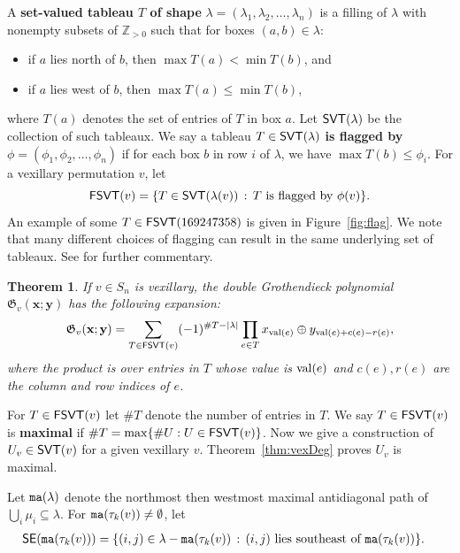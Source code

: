\documentclass[12pt]{amsart}
\newtheorem{theorem}{Theorem}[section]
\theoremstyle{definition}
\theoremstyle{remark}
\numberwithin{equation}{section}
\newcommand \maCR[1]{{\tt ma}(#1)}
\newcommand\mydef[1]{{\bf #1}}
\newcommand{\FSVT}{{\sf FSVT}}
\newcommand{\SVT}{{\sf SVT}}
\newcommand{\SE}{{\sf SE}}
\newcommand{\val}{{\rm val}}
\newcommand{\Sym}{S}
\begin{document}
A \mydef{set-valued tableau $T$ of shape} $\lambda=(\lambda_1,\lambda_2,\ldots,\lambda_n)$ is a filling 
of $\lambda$ with nonempty subsets of $\mathbb{Z}_{>0}$ such that for boxes $(a,b)\in\lambda$:
\begin{itemize}
    \item if $a$ lies north of $b$, then $\max T(a)<\min T(b)$, and
    \item if $a$ lies west of $b$, then $\max T(a)\leq\min T(b)$,
\end{itemize}
where $T(a)$  denotes the set of entries of $T$ in box $a$.
Let $\SVT(\lambda)$ be the collection of such tableaux. 
We say a tableau $T \in \SVT(\lambda)$ \mydef{is flagged by}
$\phi=(\phi_1,\phi_2,\ldots,\phi_n)$ if for each box $b$ in row $i$ of $\lambda$, we have $\max{T(b)}\leq \phi_i$. For a vexillary permutation $v$, let 
\[\FSVT(v)=\{T\in \SVT(\lambda(v)) \,:  \, T \text{ is flagged by } \phi(v)\}.\]
An example of some $T\in \FSVT(169247358)$ 
is given in Figure~\ref{fig:flag}.
We note that many different choices of flagging can result in the same underlying set of tableaux.  See \cite[Remark~3.10]{MPP} for further commentary.

\begin{theorem}\cite[Theorem 5.8]{KMY}
If $v\in \Sym_n$ is vexillary, the double Grothendieck polynomial $\mathfrak G_{v}(\mathbf x;\mathbf y)$ has the following expansion:
\begin{equation}\label{equation:gVex}
\mathfrak G_v(\mathbf{x};\mathbf{y})=\sum_{T\in \FSVT(v)}(-1)^{\#T-|\lambda|}\prod_{e\in T}x_{\val(e)}\oplus y_{\val(e)+c(e)-r(e)},
\end{equation}
where the product is over entries in $T$ whose value is $\val(e)$ and $c(e),r(e)$ are the column and row indices of $e$.
\end{theorem}

 For $T\in \FSVT(v)$ let 
$\#T$ denote the number of entries in $T$. We say $T\in \FSVT(v)$ is \mydef{maximal} if $\#T=\max\{\#U:U\in \FSVT(v)\}$.
Now we give a construction of $U_v\in \SVT(v)$ for a given vexillary $v$. Theorem~\ref{thm:vexDeg} proves $U_v$ is maximal.

Let $\maCR{\lambda}$ denote the northmost then westmost maximal antidiagonal path of $\bigcup_i\mu_i\subseteq \lambda$.
For $\maCR{\tau_k(v)}\neq \emptyset$, let 
 \begin{align*}
 \SE(\maCR{\tau_k(v)})&=\{(i,j)\in \lambda- \maCR{\tau_k(v)} \,:  \, (i,j) \text{ lies southeast of } \maCR{\tau_k(v)} \}.
\end{align*}
\end{document}
